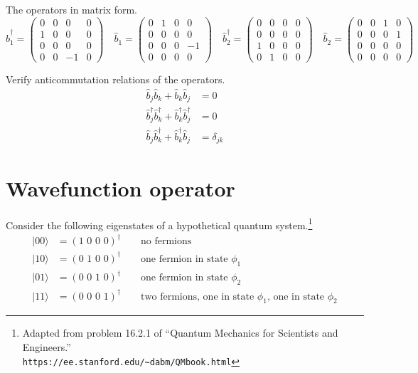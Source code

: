 \documentclass[12pt]{article}
\begin{document}
\noindent
The operators in matrix form.
\begin{equation*}
\hat{b}_1^\dag=\begin{pmatrix}0&0&0&0\\1&0&0&0\\0&0&0&0\\0&0&-1&0\end{pmatrix}
\quad
\hat{b}_1=\begin{pmatrix}0&1&0&0\\0&0&0&0\\0&0&0&-1\\0&0&0&0\end{pmatrix}
\quad
\hat{b}_2^\dag=\begin{pmatrix}0&0&0&0\\0&0&0&0\\1&0&0&0\\0&1&0&0\end{pmatrix}
\quad
\hat{b}_2=\begin{pmatrix}0&0&1&0\\0&0&0&1\\0&0&0&0\\0&0&0&0\end{pmatrix}
\end{equation*}

\noindent
Verify anticommutation relations of the operators.
\begin{align*}
\hat{b}_j\hat{b}_k+\hat{b}_k\hat{b}_j&=0
\\[2ex]
\hat{b}_j^\dag\hat{b}_k^\dag+\hat{b}_k^\dag\hat{b}_j^\dag&=0
\\[2ex]
\hat{b}_j\hat{b}_k^\dag+\hat{b}_k^\dag\hat{b}_j&=\delta_{jk}
\end{align*}

\newpage

\section{Wavefunction operator}
Consider the following eigenstates of a hypothetical quantum system.\footnote{
Adapted from problem 16.2.1 of ``Quantum Mechanics for Scientists and Engineers.''\\
{\tt https://ee.stanford.edu/{\textasciitilde}dabm/QMbook.html}}
\begin{align*}
|00\rangle&=(\text{1 0 0 0})^\dag\qquad\text{no fermions}\\
|10\rangle&=(\text{0 1 0 0})^\dag\qquad\text{one fermion in state $\phi_1$}\\
|01\rangle&=(\text{0 0 1 0})^\dag\qquad\text{one fermion in state $\phi_2$}\\
|11\rangle&=(\text{0 0 0 1})^\dag\qquad\text{two fermions, one in state $\phi_1$, one in state $\phi_2$}
\end{align*}
\end{document}

